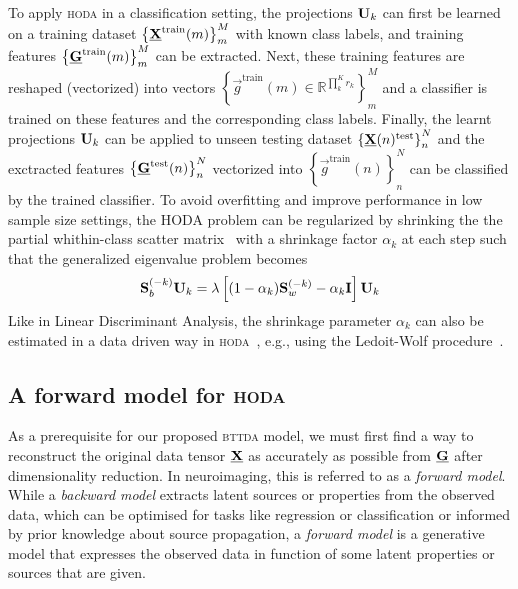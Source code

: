 \documentclass[twocolumn]{article}
\begin{document}
To apply \textsc{hoda} in a classification setting, the projections $\mathbf{U}_k$
can first be learned on a training dataset
$\left\{\underline{\mathbf{X}}^\text{train}(m)\right\}_m^M$ with known class labels, and
training features $\left\{\underline{\mathbf{G}}^\text{train}(m)\right\}_m^M$ can be extracted.
Next, these training features are reshaped (vectorized) into vectors
$\left\{\vec{g}^\text{train}(m) \in \mathbb{R}^{\prod_k^Kr_k}\right\}_m^M$ and a classifier is
trained on these features and the corresponding class labels.
Finally, the learnt projections $\mathbf{U}_k$ can be applied to unseen testing
dataset $\left\{\underline{\mathbf{X}}(n)^\text{test}\right\}_n^N$ and the exctracted features
$\left\{\underline{\mathbf{G}}^\text{test}(n)\right\}_n^N$ vectorized into
$\left\{\vec{g}^\text{train}(n)\right\}_n^N$ can be
classified by the trained classifier.
To avoid overfitting and improve performance in low sample size settings, the
\textsc{HODA} problem can be regularized by shrinking the the partial
whithin-class scatter matrix~\cite{Phan2010} with a shrinkage factor
$\alpha_k$ at each step such that the generalized eigenvalue problem becomes
\begin{equation}
	\mathbf{S}_b^{(-k)}\mathbf{U}_k =
\mathbf{\lambda}\left[(1-\alpha_k)\mathbf{S}_w^{(-k)}-\alpha_k\mathbf{I}\right]\mathbf{U}_k
\end{equation}
Like in Linear Discriminant Analysis, the shrinkage parameter $\alpha_k$ can
also be estimated in a data driven way in \textsc{hoda}~\cite{Jorajuria2022},
e.g., using the Ledoit-Wolf procedure~\cite{Ledoit2003}.


\subsection{A forward model for \textsc{hoda}}
As a prerequisite for our proposed \textsc{bttda} model, we must first find a
way to reconstruct the original data tensor $\underline{\mathbf{X}}$ as accurately as possible
from $\underline{\mathbf{G}}$ after dimensionality reduction.
In neuroimaging, this is referred to as a \textit{forward model}.
While a \textit{backward model} extracts latent sources or properties from the observed
data, which can be optimised for tasks like regression or classification or
informed by prior knowledge about source propagation, a \textit{forward model} is a
generative model that expresses the observed data in function of some latent
properties or sources that are given.
\end{document}
